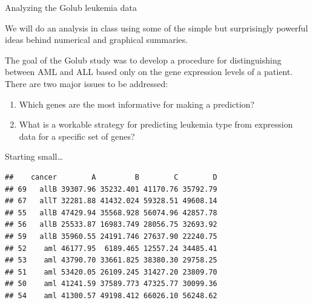 \documentclass[
  ignorenonframetext,
]{beamer}
\begin{document}
\begin{frame}{Analyzing the Golub leukemia data}
\protect\hypertarget{analyzing-the-golub-leukemia-data}{}

We will do an analysis in class using some of the simple but
surprisingly powerful ideas behind numerical and graphical summaries.

The goal of the Golub study was to develop a procedure for
distinguishing between AML and ALL based only on the gene expression
levels of a patient. There are two major issues to be addressed:

\begin{enumerate}
\item
  Which genes are the most informative for making a prediction?
\item
  What is a workable strategy for predicting leukemia type from
  expression data for a specific set of genes?
\end{enumerate}

\end{frame}

\begin{frame}[fragile]{Starting small\ldots{}}
\protect\hypertarget{starting-small}{}

\footnotesize

\scriptsize

\begin{verbatim}
##    cancer        A         B        C        D
## 69   allB 39307.96 35232.401 41170.76 35792.79
## 67   allT 32281.88 41432.024 59328.51 49608.14
## 55   allB 47429.94 35568.928 56074.96 42857.78
## 56   allB 25533.87 16983.749 28056.75 32693.92
## 59   allB 35960.55 24191.746 27637.90 22240.75
## 52    aml 46177.95  6189.465 12557.24 34485.41
## 53    aml 43790.70 33661.825 38380.30 29758.25
## 51    aml 53420.05 26109.245 31427.20 23809.70
## 50    aml 41241.59 37589.773 47325.77 30099.36
## 54    aml 41300.57 49198.412 66026.10 56248.62
\end{verbatim}

\normalsize

\end{frame}
\end{document}
